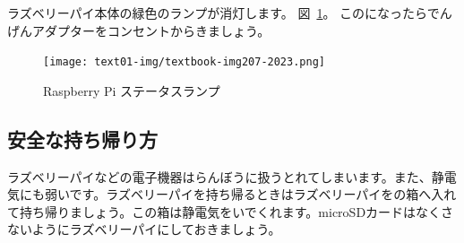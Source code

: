 \flushleft
\textcolor[rgb]{0.13333334,0.13333334,0.13333334}{ラズベリーパイ本体の緑色のランプが消灯します。
  図~\ref{fig:47}。
  このになったらでんげんアダプターをコンセントからきましょう。}

\begin{figure}[h]
  \centering
  \begin{minipage}{6cm}
    {\upshape
      \texttt{[image: text01-img/textbook-img207-2023.png]}
      \caption{Raspberry Pi ステータスランプ}\label{fig:47}
    }
  \end{minipage}
\end{figure}

\clearpage

\subsection{安全な持ち帰り方}
ラズベリーパイなどの電子機器はらんぼうに扱うとれてしまいます。また、静電気にも弱いです。ラズベリーパイを持ち帰るときはラズベリーパイをの箱へ入れて持ち帰りましょう。この箱は静電気をいでくれます。microSDカードはなくさないようにラズベリーパイにしておきましょう。

\clearpage

